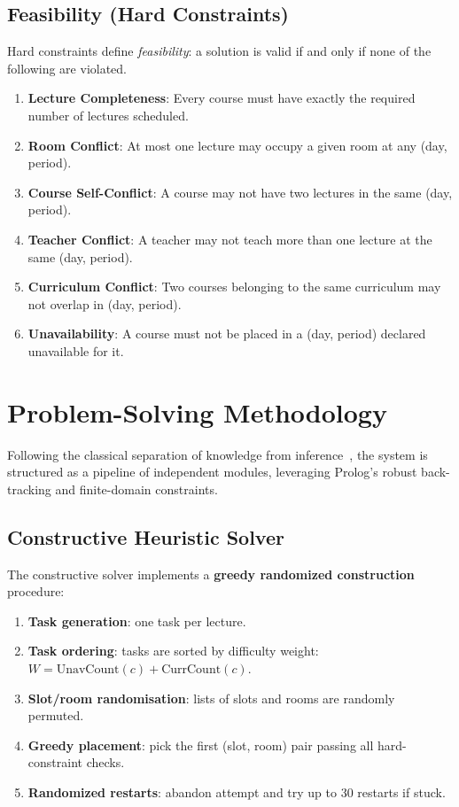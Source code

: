 \documentclass[11pt,letterpaper]{article}
\begin{document}
\subsection{Feasibility (Hard Constraints)}
Hard constraints define \emph{feasibility}: a solution is valid if and only if none of the following are violated.
\begin{enumerate}[label=\textbf{H\arabic*.},nosep]
  \item \textbf{Lecture Completeness}: Every course must have exactly the required number of lectures scheduled.
  \item \textbf{Room Conflict}: At most one lecture may occupy a given room at any (day, period).
  \item \textbf{Course Self-Conflict}: A course may not have two lectures in the same (day, period).
  \item \textbf{Teacher Conflict}: A teacher may not teach more than one lecture at the same (day, period).
  \item \textbf{Curriculum Conflict}: Two courses belonging to the same curriculum may not overlap in (day, period).
  \item \textbf{Unavailability}: A course must not be placed in a (day, period) declared unavailable for it.
\end{enumerate}

\section{Problem-Solving Methodology}
Following the classical separation of knowledge from inference~\cite{guyette1994rule}, the system is structured as a pipeline of independent modules, leveraging Prolog's robust back-tracking and finite-domain constraints.

\subsection{Constructive Heuristic Solver}
The constructive solver implements a \textbf{greedy randomized construction} procedure:
\begin{enumerate}[nosep]
  \item \textbf{Task generation}: one task per lecture.
  \item \textbf{Task ordering}: tasks are sorted by difficulty weight: $W = \text{UnavCount}(c) + \text{CurrCount}(c)$.
  \item \textbf{Slot/room randomisation}: lists of slots and rooms are randomly permuted.
  \item \textbf{Greedy placement}: pick the first (slot, room) pair passing all hard-constraint checks.
  \item \textbf{Randomized restarts}: abandon attempt and try up to 30 restarts if stuck.
\end{enumerate}
\end{document}
